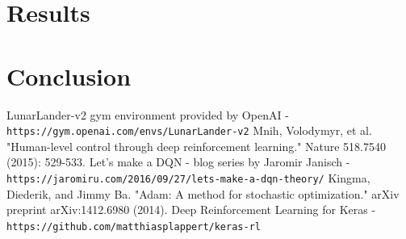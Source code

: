 \documentclass{svproc}
\begin{document}
\section{Results}
\section{Conclusion}
\begin{thebibliography}{}
LunarLander-v2 gym environment provided by OpenAI - \texttt{https://gym.openai.com/envs/LunarLander-v2}
Mnih, Volodymyr, et al. "Human-level control through deep reinforcement learning." Nature 518.7540 (2015): 529-533.
Let’s make a DQN - blog series by Jaromir Janisch - \texttt{https://jaromiru.com/2016/09/27/lets-make-a-dqn-theory/}
Kingma, Diederik, and Jimmy Ba. "Adam: A method for stochastic optimization." arXiv preprint arXiv:1412.6980 (2014).
Deep Reinforcement Learning for Keras - \texttt{https://github.com/matthiasplappert/keras-rl}
\end{thebibliography}
\end{document}
